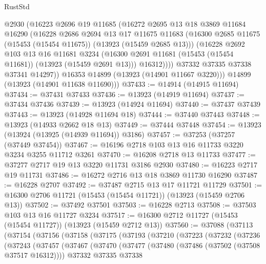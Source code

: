 \begin{lexlean}{RustStd}
\begin{coremodule}
            @2930
            (@16223
              @2696
              @19
              @11685
              (@16272
                @2695
                @13
                @18
                @3869
                @11684
                @16290
                (@16228
                  @2686
                  @2694
                  @13
                  @17
                  @11675
                  @11683
                  (@16300 @2685 @11675 (@15453 (@15454 @11675)) (@13923 (@15459 @2685 @13)))
                  (@16228
                    @2692
                    @103
                    @13
                    @16
                    @11681
                    @3234
                    (@16300 @2691 @11681 (@15453 (@15454 @11681)) (@13923 (@15459 @2691 @13)))
                    @16312))))
            @37332
            @37335
            @37338
            @37341
            @14297))
        @16353
        @14899
        (@13923 (@14901 @11667 @3220)))
      @14899
      (@13923 (@14901 @11638 @11690)))
@37433 := @14914 (@14915 @11694)
@37434 := @37431 @37433
@37436 := @13923 (@14919 @11694)
@37437 := @37434 @37436
@37439 := @13923 (@14924 @11694)
@37440 := @37437 @37439
@37443 := @13923 (@14928 @11694 @18)
@37444 := @37440 @37443
@37448 := @13923 (@14933 @2662 @18 @13)
@37449 := @37444 @37448
@37454 := @13923 (@13924 (@13925 (@14939 @11694)) @3186)
@37457 := @37253 (@37257 (@37449 @37454))
@37467 := @16196 @2718 @103 @13 @16 @11733 @3220 @3234 @3255 @11712 @3261
@37470 := @16208 @2718 @13 @11733
@37477 := @37277 @2717 @19 @13 @3220 @11731 @3186 @2930
@37480 := @16223 @2717 @19 @11731
@37486 := @16272 @2716 @13 @18 @3869 @11730 @16290
@37487 := @16228 @2707
@37492 := @37487 @2715 @13 @17 @11721 @11729
@37501 := @16300 @2706 @11721 (@15453 (@15454 @11721)) (@13923 (@15459 @2706 @13))
@37502 := @37492 @37501
@37503 := @16228 @2713
@37508 := @37503 @103 @13 @16 @11727 @3234
@37517 := @16300 @2712 @11727 (@15453 (@15454 @11727)) (@13923 (@15459 @2712 @13))
@37560 := @37088
    (@37113
      (@37154
        (@37156
          (@37158
            (@37175
              (@37193
                (@37210
                  (@37223
                    (@37232
                      (@37236
                        (@37243
                          (@37457
                            (@37467
                              (@37470
                                (@37477
                                  (@37480 (@37486 (@37502 (@37508 @37517 @16312))))
                                  @37332
                                  @37335
                                  @37338

\end{coremodule}
\end{lexlean}
